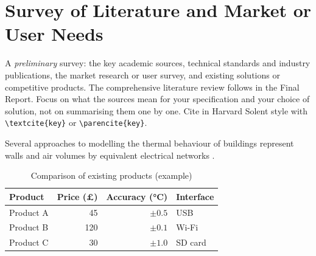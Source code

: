 \section{Survey of Literature and Market or User Needs}
\label{sec:literature}

\begin{guidance}
A \emph{preliminary} survey: the key academic sources, technical standards
and industry publications, the market research or user survey, and existing
solutions or competitive products. The comprehensive literature review
follows in the Final Report. Focus on what the sources mean for your
specification and your choice of solution, not on summarising them one by
one. Cite in Harvard Solent style with \verb|\textcite{key}| or
\verb|\parencite{key}|.
\end{guidance}

Several approaches to modelling the thermal behaviour of buildings
represent walls and air volumes by equivalent electrical networks
\parencite{achterbosch1985}. 

\begin{table}[htbp]
  \centering
  \caption{Comparison of existing products (example)}
  \label{tab:market}
  \begin{tabular}{lrrl}
    \toprule
    Product   & Price (£) & Accuracy (\si{\celsius}) & Interface \\
    \midrule
    Product A & 45  & $\pm 0.5$ & USB     \\
    Product B & 120 & $\pm 0.1$ & Wi-Fi   \\
    Product C & 30  & $\pm 1.0$ & SD card \\
    \bottomrule
  \end{tabular}
\end{table}
